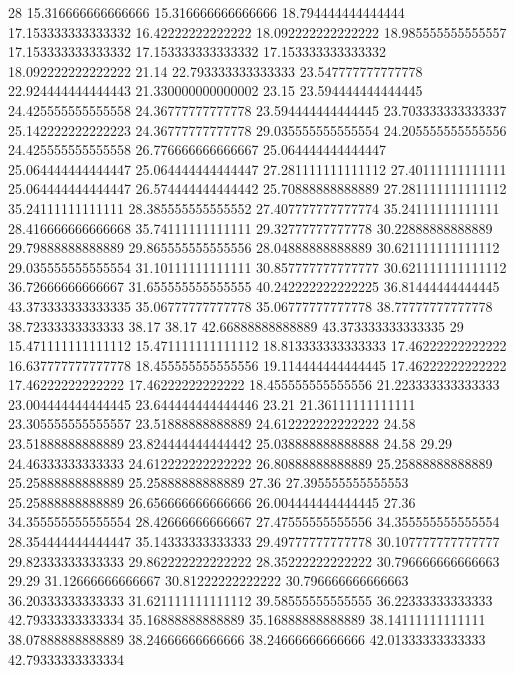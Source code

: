28 15.316666666666666 15.316666666666666 18.794444444444444 17.153333333333332 16.42222222222222 18.092222222222222 18.985555555555557 17.153333333333332 17.153333333333332 17.153333333333332 18.092222222222222 21.14 22.793333333333333 23.547777777777778 22.924444444444443 21.330000000000002 23.15 23.594444444444445 24.425555555555558 24.36777777777778 23.594444444444445 23.703333333333337 25.142222222222223 24.36777777777778 29.035555555555554 24.205555555555556 24.425555555555558 26.776666666666667 25.064444444444447 25.064444444444447 25.064444444444447 27.281111111111112 27.40111111111111 25.064444444444447 26.574444444444442 25.70888888888889 27.281111111111112 35.24111111111111 28.385555555555552 27.407777777777774 35.24111111111111 28.416666666666668 35.74111111111111 29.32777777777778 30.22888888888889 29.79888888888889 29.865555555555556 28.04888888888889 30.621111111111112 29.035555555555554 31.10111111111111 30.857777777777777 30.621111111111112 36.72666666666667 31.655555555555555 40.242222222222225 36.81444444444445 43.373333333333335 35.06777777777778 35.06777777777778 38.77777777777778 38.72333333333333 38.17 38.17 42.66888888888889 43.373333333333335
29 15.471111111111112 15.471111111111112 18.813333333333333 17.46222222222222 16.637777777777778 18.455555555555556 19.114444444444445 17.46222222222222 17.46222222222222 17.46222222222222 18.455555555555556 21.223333333333333 23.004444444444445 23.644444444444446 23.21 21.36111111111111 23.305555555555557 23.51888888888889 24.612222222222222 24.58 23.51888888888889 23.824444444444442 25.038888888888888 24.58 29.29 24.46333333333333 24.612222222222222 26.80888888888889 25.25888888888889 25.25888888888889 25.25888888888889 27.36 27.395555555555553 25.25888888888889 26.656666666666666 26.004444444444445 27.36 34.355555555555554 28.42666666666667 27.47555555555556 34.355555555555554 28.354444444444447 35.14333333333333 29.49777777777778 30.107777777777777 29.82333333333333 29.862222222222222 28.35222222222222 30.796666666666663 29.29 31.12666666666667 30.81222222222222 30.796666666666663 36.20333333333333 31.621111111111112 39.58555555555555 36.22333333333333 42.79333333333334 35.16888888888889 35.16888888888889 38.14111111111111 38.07888888888889 38.24666666666666 38.24666666666666 42.01333333333333 42.79333333333334
